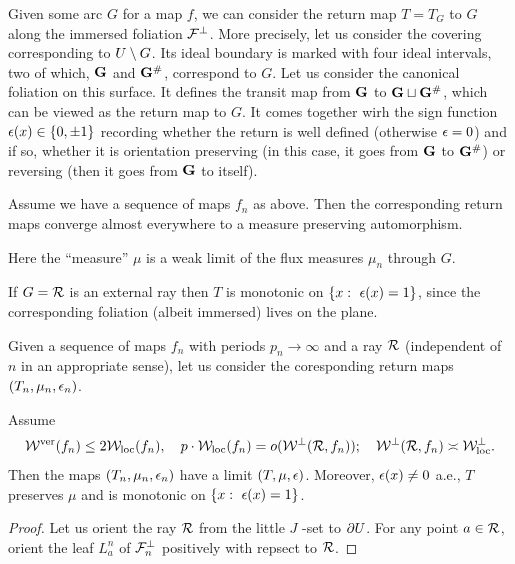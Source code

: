 {{Given some arc $G$ for a map $f$, we can consider the return map $T=T_G$ to $G$ along the
immersed foliation ${\mathcal F}^\perp$. 
More precisely, let us consider the covering corresponding to $U\setminus
G$.  Its ideal boundary is marked with four ideal intervals, two of which, 
${\mathbf{G}}$ and ${\mathbf{G}}^\#$, correspond to $G$.
Let us consider the canonical foliation on this surface. 
It defines the  transit map from ${\mathbf{G}}$ to ${\mathbf{G}}\sqcup {\mathbf{G}}^\#$,
which  can be viewed as the return map to $G$.  
 It comes together wirh 
the sign function ${\epsilon}(x)\in \{0,\pm 1\}$ recording whether the return is well defined
(otherwise ${\epsilon}=0$) and if so, whether it is  orientation
preserving (in this case, it goes from ${\mathbf{G}}$ to ${\mathbf{G}}^\#$) or
reversing (then it  goes from ${\mathbf{G}}$ to itself). 

\begin{lem}
  Assume we have a sequence of maps $f_n$ as above. Then the
  corresponding return maps converge almost everywhere to a
   measure preserving automorphism. 
\end{lem}

Here the ``measure'' $\mu$  is a weak limit of the flux measures
$\mu_n$ through $G$. 

If $G={\mathcal R}$ is an external ray then  $T$ is monotonic on $\{x: \ {\epsilon} (x)=1 \} $,
since the corresponding foliation (albeit immersed)  
 lives on the plane. 


Given a sequence of maps $f_n$ with periods $p_n \to \infty$ 
and a ray  ${\mathcal R}$ (independent of $n$ in an appropriate sense),
let us consider  the coresponding return maps $(T_n, \mu_n, {\epsilon}_n)$. 


\begin{lem}
  Assume 
$$  {\mathcal W}^{\mathrm {ver}} (f_n) \leq 2 {\mathcal W}_{\mathrm{loc}} (f_n), \quad p\cdot {\mathcal W}_{\mathrm{loc}} (f_n) = o({\mathcal W}^\perp ({\mathcal R}, f_n)); \quad
  {\mathcal W}^\perp ({\mathcal R}, f_n)\asymp  {\mathcal W}^\perp_{\mathrm{loc}}.
$$ 
Then the maps $(T_n, \mu_n, {\epsilon}_n)$ have a limit
$(T, \mu, {\epsilon})$. Moreover, ${\epsilon}(x)\not= 0$ a.e., $T$ preserves $\mu$ and is monotonic on 
 $\{x: \ {\epsilon}(x)=1 \} $.
\end{lem}

\begin{proof} 
Let us orient  the ray ${\mathcal R}$ from the little $J$ -set to $\partial U$.
For any point $a\in {\mathcal R}$,  orient the leaf $L_a^n$ of
${\mathcal F}_n^\perp$ positively with repsect to ${\mathcal R}$.  


\end{proof}}}
